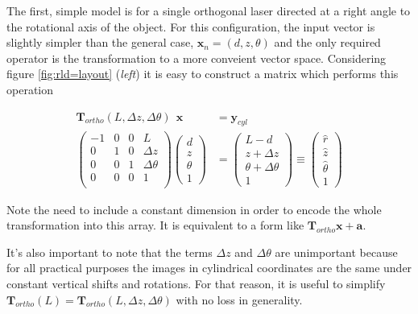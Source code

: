 The first, simple model is for a single orthogonal laser directed at a
right angle to the rotational axis of the object. For this
configuration, the input vector is slightly simpler than the general
case, $\mathbf{x}_{n} = \left(d, z, \theta\right)$ and the only
required operator is the transformation to a more conveient vector
space. Considering figure \ref{fig:rld=layout} (\textit{left}) it is
easy to construct a matrix which performs this operation

\begin{align}
  \mathbf{T}_{ortho}(L, \Delta z, \Delta \theta)\ \  \mathbf{x} &= \mathbf{y}_{cyl} \\
  \left(
    \begin{array}{cccc}
      -1 & 0 & 0 & L             \\
      0  & 1 & 0 & \Delta z      \\
      0  & 0 & 1 & \Delta \theta \\
      0  & 0 & 0 & 1             \\ 
    \end{array}
  \right)
  \left(
    \begin{array}{c}
      d \\ z \\ \theta \\ 1
    \end{array}
  \right)
  &=
  \left(
    \begin{array}{c}
       L - d \\ z + \Delta z \\ \theta + \Delta\theta \\ 1
    \end{array}
  \right)
  \equiv
  \left(
    \begin{array}{c}
      \hat{r} \\ \hat{z} \\ \hat{\theta} \\ 1
    \end{array}
  \right)
\end{align}

Note the need to include a constant dimension in order to encode the
whole transformation into this array. It is equivalent to a form like
$\mathbf{T}_{ortho} \mathbf{x} + \mathbf{a}$.

It's also important to note that the terms $\Delta z$ and
$\Delta\theta$ are unimportant because for all practical purposes the
images in cylindrical coordinates are the same under constant vertical
shifts and rotations. For that reason, it is useful to simplify
$\mathbf{T}_{ortho}(L) = \mathbf{T}_{ortho}(L, \Delta z,
\Delta\theta)$ with no loss in generality.

